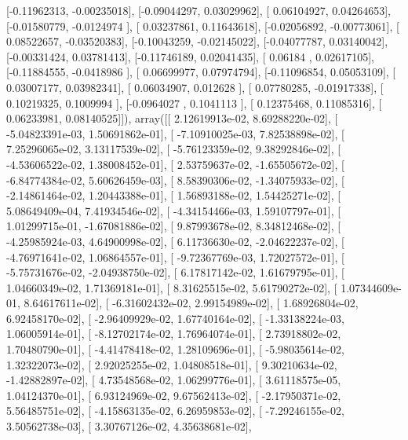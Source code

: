 \documentclass{article}
\begin{document}
       [-0.11962313, -0.00235018],
       [-0.09044297,  0.03029962],
       [ 0.06104927,  0.04264653],
       [-0.01580779, -0.0124974 ],
       [ 0.03237861,  0.11643618],
       [-0.02056892, -0.00773061],
       [ 0.08522657, -0.03520383],
       [-0.10043259, -0.02145022],
       [-0.04077787,  0.03140042],
       [-0.00331424,  0.03781413],
       [-0.11746189,  0.02041435],
       [ 0.06184   ,  0.02617105],
       [-0.11884555, -0.0418986 ],
       [ 0.06699977,  0.07974794],
       [-0.11096854,  0.05053109],
       [ 0.03007177,  0.03982341],
       [ 0.06034907,  0.012628  ],
       [ 0.07780285, -0.01917338],
       [ 0.10219325,  0.1009994 ],
       [-0.0964027 ,  0.1041113 ],
       [ 0.12375468,  0.11085316],
       [ 0.06233981,  0.08140525]]), array([[  2.12619913e-02,   8.69288220e-02],
       [ -5.04823391e-03,   1.50691862e-01],
       [ -7.10910025e-03,   7.82538898e-02],
       [  7.25296065e-02,   3.13117539e-02],
       [ -5.76123359e-02,   9.38292846e-02],
       [ -4.53606522e-02,   1.38008452e-01],
       [  2.53759637e-02,  -1.65505672e-02],
       [ -6.84774384e-02,   5.60626459e-03],
       [  8.58390306e-02,  -1.34075933e-02],
       [ -2.14861464e-02,   1.20443388e-01],
       [  1.56893188e-02,   1.54425271e-02],
       [  5.08649409e-04,   7.41934546e-02],
       [ -4.34154466e-03,   1.59107797e-01],
       [  1.01299715e-01,  -1.67081886e-02],
       [  9.87993678e-02,   8.34812468e-02],
       [ -4.25985924e-03,   4.64900998e-02],
       [  6.11736630e-02,  -2.04622237e-02],
       [ -4.76971641e-02,   1.06864557e-01],
       [ -9.72367769e-03,   1.72027572e-01],
       [ -5.75731676e-02,  -2.04938750e-02],
       [  6.17817142e-02,   1.61679795e-01],
       [  1.04660349e-02,   1.71369181e-01],
       [  8.31625515e-02,   5.61790272e-02],
       [  1.07344609e-01,   8.64617611e-02],
       [ -6.31602432e-02,   2.99154989e-02],
       [  1.68926804e-02,   6.92458170e-02],
       [ -2.96409929e-02,   1.67740164e-02],
       [ -1.33138224e-03,   1.06005914e-01],
       [ -8.12702174e-02,   1.76964074e-01],
       [  2.73918802e-02,   1.70480790e-01],
       [ -4.41478418e-02,   1.28109696e-01],
       [ -5.98035614e-02,   1.32322073e-02],
       [  2.92025255e-02,   1.04808518e-01],
       [  9.30210634e-02,  -1.42882897e-02],
       [  4.73548568e-02,   1.06299776e-01],
       [  3.61118575e-05,   1.04124370e-01],
       [  6.93124969e-02,   9.67562413e-02],
       [ -2.17950371e-02,   5.56485751e-02],
       [ -4.15863135e-02,   6.26959853e-02],
       [ -7.29246155e-02,   3.50562738e-03],
       [  3.30767126e-02,   4.35638681e-02],
\end{document}
